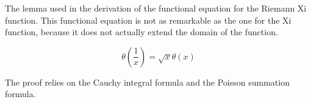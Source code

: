 \documentclass[12pt]{article}
\begin{document}
The lemma used in the derivation of the functional equation for the Riemann Xi function. This functional equation is not as remarkable as the one for the Xi function, because it does not actually extend the domain of the function.

$$
\theta\left(\frac{1}{x}\right) = \sqrt{x} \theta(x)
$$

The proof relies on the Cauchy integral formula and the Poisson summation formula.
\end{document}
